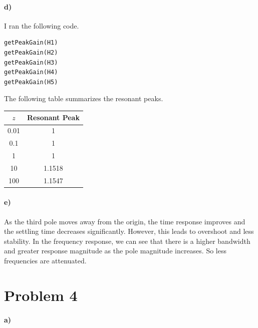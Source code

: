 \documentclass[12pt]{article}
\begin{document}
\paragraph{d)}

I ran the following code.
\begin{verbatim}
getPeakGain(H1)
getPeakGain(H2)
getPeakGain(H3)
getPeakGain(H4)
getPeakGain(H5)
\end{verbatim}
The following table summarizes the resonant peaks.
\begin{center}
    \begin{tabular}{c|c}
        \(z\) & Resonant Peak\\
        \hline
        0.01 & 1\\
        0.1 & 1\\
        1 & 1\\
        10 & 1.1518\\
        100 & 1.1547
    \end{tabular}
\end{center}

\paragraph{e)}

As the third pole moves away from the origin, the time response improves and the settling time decreases significantly.
However, this leads to overshoot and less stability. In the frequency response, we can see that there is a higher
bandwidth and greater response magnitude as the pole magnitude increases. So less frequencies are attenuated.

\section*{Problem 4}

\paragraph{a)}
\end{document}
